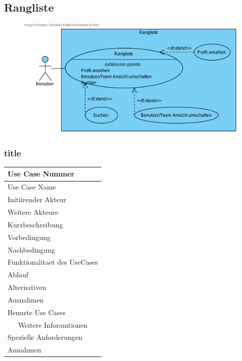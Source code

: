 \documentclass[10pt,a4paper]{article}
\begin{document}
\subsection{Rangliste}
	\begin{figure}[h]
		\includegraphics[width=\linewidth,]{gfx/webseite/rangliste.pdf}
	\end{figure}
	\subsubsection{title}
		\begin{tabular}{|l|p{.5\linewidth}|}
		\hline Use Case Nummer &  \\ 
		\hline Use Case Name &  \\ 
		\hline Initiirender Akteur &  \\
		\hline Weitere Akteure &  \\
		\hline Kurzbeschreibung &  \\
		\hline Vorbedingung &  \\
		\hline Nachbedingung &  \\
		\hline \multicolumn{2}{|c|}{Funktionalitaet des UseCases}\\
		\hline Ablauf &  \\
		\hline Alternativen &  \\
		\hline Ausnahmen &  \\
		\hline Benuzte Use Cases &  \\
		\hline \multicolumn{2}{|c|}{Weitere Inforamtionen} \\
		\hline Spezielle Anforderungen &  \\
		\hline Annahmen &  \\
		\hline
		\end{tabular}
\end{document}
